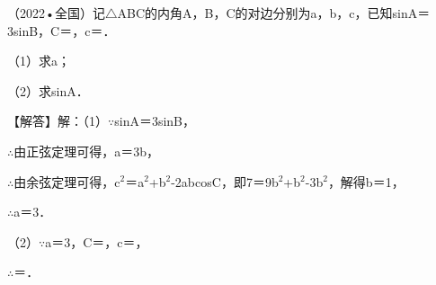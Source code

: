 \begin{question}
（2022•全国）记$\triangle$ABC的内角A，B，C的对边分别为a，b，c，已知sinA＝3sinB，C＝\allowbreak{}，c＝\allowbreak{}．\par
（1）求a；\par
（2）求sinA．\par
\begin{solution}
【解答】解：（1）$\because$sinA＝3sinB，\par
$\therefore$由正弦定理可得，a＝3b，\par
$\therefore$由余弦定理可得，c$^{2}$＝a$^{2}$+b$^{2}$-2abcosC，即7＝9b$^{2}$+b$^{2}$-3b$^{2}$，解得b＝1，\par
$\therefore$a＝3．\par
（2）$\because$a＝3，C＝\allowbreak{}，c＝\allowbreak{}，\par
$\therefore$\allowbreak{}＝\allowbreak{}．\par
\end{solution}
\end{question}


